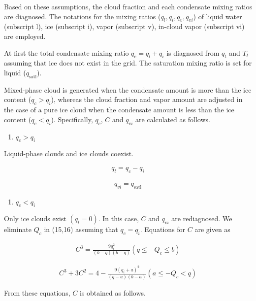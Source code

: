 Based on these assumptions, the cloud fraction and each condensate
mixing ratios are diagnosed. The notations for the mixing ratios
(\(q_l, q_i, q_v, q_{vi}\)) of liquid water (subscript l), ice
(subscript i), vapor (subscript v), in-cloud vapor (subscript vi) are
employed.

At first the total condensate mixing ratio \(q_c=q_l+q_i\) is diagnosed
from \(q_t\) and \(T_l\) assuming that ice does not exist in the grid.
The saturation mixing ratio is set for liquid (\(q_{\text{satl}}\)).

Mixed-phase cloud is generated when the condensate amount is more than
the ice content (\(q_c>q_i\)), whereas the cloud fraction and vapor
amount are adjusted in the case of a pure ice cloud when the condensate
amount is less than the ice content (\(q_c<q_i\)). Specifically,
\(q_c\), \(C\) and \(q_{vi}\) are calculated as follows.

\begin{enumerate}
\def\labelenumi{\arabic{enumi}.}
\tightlist
\item
  \(q_c>q_i\)
\end{enumerate}

Liquid-phase clouds and ice clouds coexist.

\begin{eqnarray}
q_l= q_c-q_i
\end{eqnarray}

\begin{eqnarray}
q_{vi} = q_{\text{satl}}
\end{eqnarray}

\begin{enumerate}
\def\labelenumi{\arabic{enumi}.}
\setcounter{enumi}{1}
\tightlist
\item
  \(q_c<q_i\)
\end{enumerate}

Only ice clouds exist \((q_l=0)\). In this case, \(C\) and \(q_{vi}\)
are rediagnosed. We eliminate \(Q_c\) in (15,16) assuming that
\(q_c=q_i\). Equations for \(C\) are given as

\begin{eqnarray}
C^{3}=\frac{9 q_{i}^{2}}{(b-q)(b-q)} \left(q \leq-Q_{c} \leq b\right)
\end{eqnarray}

\begin{eqnarray}
C^{3}+3 C^{2}=4-\frac{9\left(q_{i}+a\right)^{2}}{(q-a)(b-a)} \left(a \leq-Q_{c}<q\right)
\end{eqnarray}

From these equations, \(C\) is obtained as follows.

